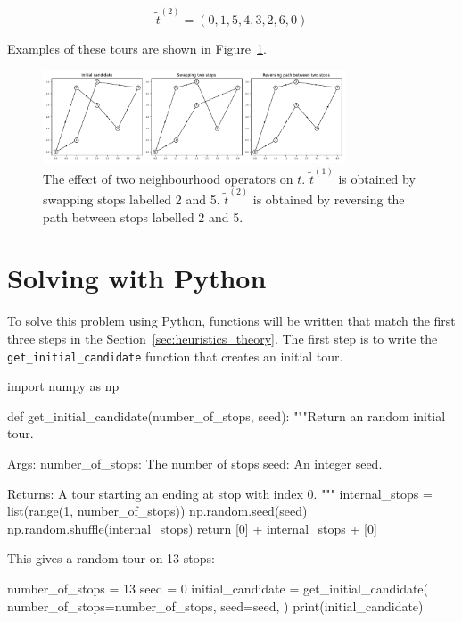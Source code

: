 \[
    \tilde t^{(2)} = (0, 1, 5, 4, 3, 2, 6, 0)
\]

Examples of these tours are shown in
Figure~\ref{fig:tsp-effect-of-neighbourhood-operators}.

\begin{figure}[!hbtp]
    \begin{center}
        \includegraphics[width=0.8\textwidth]{./assets/tsp-effect-of-neighbourhood-operators/main.pdf}
    \end{center}
    \caption{The effect of two neighbourhood operators on \(t\). \(\tilde t^{(1)}\) is
    obtained by swapping stops labelled 2 and 5. \(\tilde t^{(2)}\) is obtained by reversing the
    path between stops labelled 2 and 5.}
    \label{fig:tsp-effect-of-neighbourhood-operators}
\end{figure}

\section{Solving with Python}\label{sec:heuristics_solving-with-python}

To solve this problem using Python, functions will be written that match the
first three steps in the Section~\ref{sec:heuristics_theory}.
The first step is to write the \texttt{get_initial_candidate}
function that creates an initial tour.

\begin{pyin}
import numpy as np


def get_initial_candidate(number_of_stops, seed):
    """Return an random initial tour.

    Args:
        number_of_stops: The number of stops
        seed: An integer seed.

    Returns:
        A tour starting an ending at stop with index 0.
    """
    internal_stops = list(range(1, number_of_stops))
    np.random.seed(seed)
    np.random.shuffle(internal_stops)
    return [0] + internal_stops + [0]
\end{pyin}

This gives a random tour on 13 stops:

\begin{pyin}
number_of_stops = 13
seed = 0
initial_candidate = get_initial_candidate(
    number_of_stops=number_of_stops,
    seed=seed,
)
print(initial_candidate)
\end{pyin}

